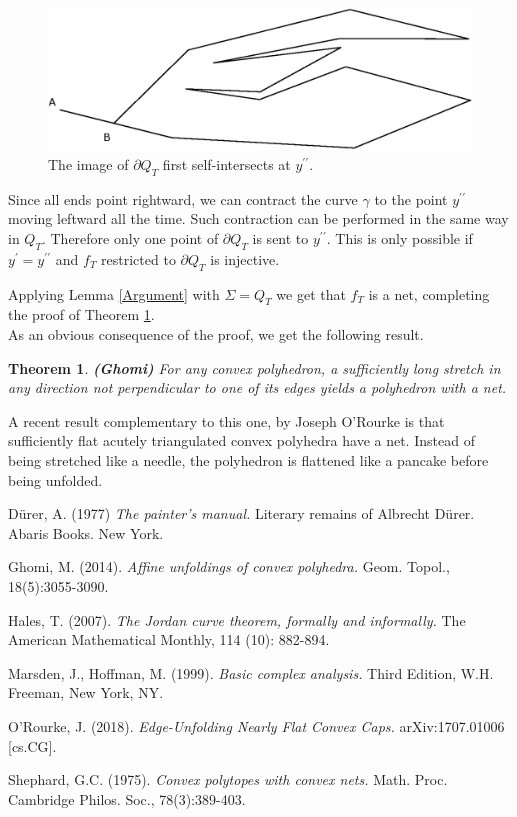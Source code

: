 \documentclass{article}
\theoremstyle{theorem}
\newtheorem{teorema}{Theorem}
\begin{document}
\begin{figure}[h]
\centering
{}
\includegraphics[scale=0.65]{Prime.eps}
\caption{The image of $\partial Q_T$ first self-intersects at $y^{\prime \prime}$.}\label{Gamma}
\end{figure}


Since all ends point rightward, we can contract the curve $\gamma$ to the point  $y^{\prime \prime}$ moving leftward all the time. Such contraction can be performed in the same way in $Q_T$. Therefore only one point of $\partial Q _T$ is sent to $y^{\prime \prime}$. This is only possible if $y^{\prime} = y^{\prime \prime}$ and $f_T$ restricted to $\partial Q_T$ is injective.


Applying Lemma \ref{Argument} with $\Sigma =Q_T$ we get that $f_T$ is a net, completing the proof of Theorem \ref{Gho}.\\


As an obvious consequence of the proof, we get the following result.



\begin{teorema}\label{Gho}
{\textbf{(Ghomi)} For any convex polyhedron, a sufficiently long stretch in any direction not perpendicular to one of its edges yields a polyhedron with a net.}
\end{teorema}


A recent result complementary to this one, by Joseph O'Rourke \cite{OR} is that sufficiently flat acutely triangulated convex polyhedra have a net. Instead of being stretched like a needle, the polyhedron is flattened like a pancake before being unfolded.


\begin{thebibliography}{9}

 D\"{u}rer, A. (1977) \textit{The painter's manual.} Literary remains of Albrecht D\"{u}rer. Abaris Books. New York.

 Ghomi, M. (2014). \textit{Affine unfoldings of convex polyhedra.} Geom. Topol., 18(5):3055-3090.
  
  
  Hales, T. (2007). \textit{The Jordan curve theorem, formally and informally.} The American Mathematical Monthly, 114 (10): 882-894.

  Marsden, J., Hoffman, M. (1999). \textit{Basic complex analysis.} Third Edition, W.H. Freeman, New York, NY. 

  O'Rourke, J. (2018). \textit{Edge-Unfolding Nearly Flat Convex Caps.} arXiv:1707.01006 [cs.CG].

Shephard, G.C. (1975). \textit{Convex polytopes with convex nets.} Math. Proc. Cambridge Philos. Soc., 78(3):389-403. 
  
\end{thebibliography}
\end{document}
